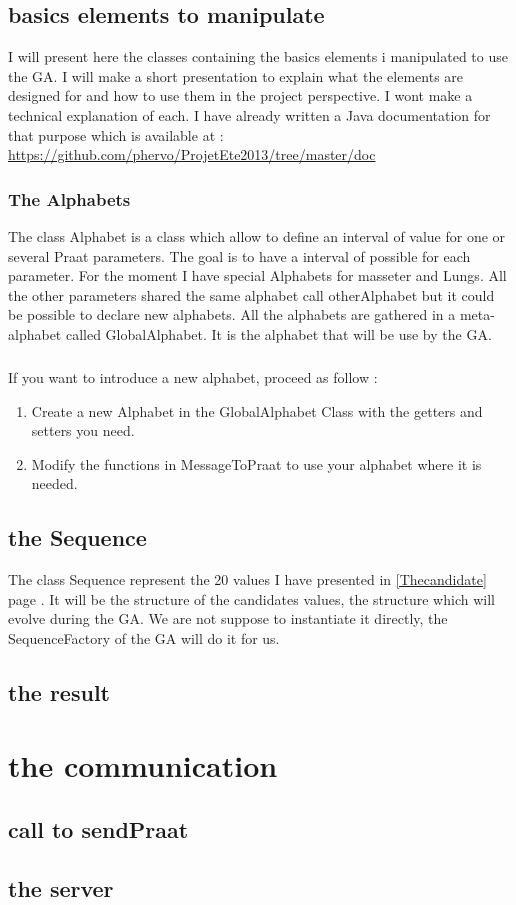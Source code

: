 \documentclass[12pt]{report}
\begin{document}
\section{basics elements to manipulate}
I will present here the classes containing the basics elements i manipulated to use the GA.
I will make a short presentation to explain what the elements are designed for and how to use them in the project perspective. I wont make a technical explanation of each. I have already written a Java documentation for that purpose which is available at : \url{https://github.com/phervo/ProjetEte2013/tree/master/doc}

\subsection{The Alphabets}
The class Alphabet is a class which allow to define an interval of value for one or several Praat parameters.
The goal is to have a interval of possible for each parameter.
For the moment I have  special Alphabets for masseter and Lungs. All the other parameters shared the same alphabet call otherAlphabet but it could be possible to declare new alphabets. All the alphabets are gathered in a meta-alphabet called GlobalAlphabet. It is the alphabet that will be use by the GA.

\paragraph*{}
If you want to introduce a new alphabet, proceed as follow :
\begin{enumerate}
\item Create a new Alphabet in the GlobalAlphabet Class with the getters and setters you need.
\item Modify the functions in MessageToPraat to use your alphabet where it is needed.
\end{enumerate}

\section{the Sequence}
The class Sequence represent the 20 values I have presented in \ref{Thecandidate} page \pageref{Thecandidate}. It will be the structure of the candidates values, the structure which will evolve during the GA. We are not suppose to instantiate it directly, the SequenceFactory of the GA will do it for us.

\section{the result}

\chapter{the communication}
\section{call to sendPraat}
\section{the server}

\listoffigures
\listoftables

 
\end{document}
